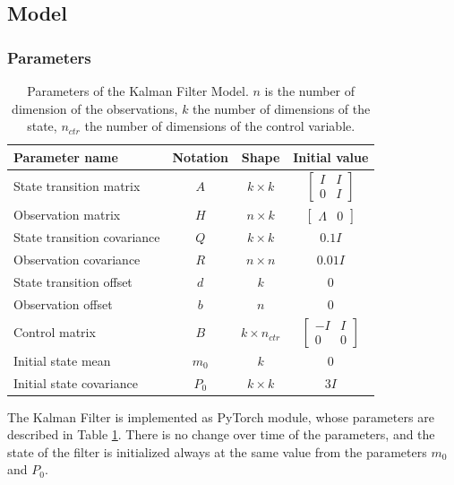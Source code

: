\documentclass{article}
\let\Oldsubsection\subsection
\renewcommand{\subsection}{\FloatBarrier\Oldsubsection}
\begin{document}
\subsection{Model}

\subsubsection{Parameters}

\begin{table}
\caption{Parameters of the Kalman Filter Model. $n$ is the number of dimension of the observations, $k$ the number of dimensions of the state, $n_{ctr}$ the number of dimensions of the control variable.}
\label{table:parameters}
\vspace{5pt}
\begin{tabular}{l c c c}
\toprule
    \bfseries Parameter name & \bfseries Notation & \bfseries Shape & \bfseries Initial value\\
    \hline
    \noalign{\vspace{4pt}}
    State transition matrix & $A$ & $k \times k$ & $\begin{bmatrix}I & I \\ 0 & I\end{bmatrix}$ \\
    \noalign{\vspace{4pt}}
    Observation matrix & $H$ & $n \times k$ & $\begin{bmatrix}\Lambda & 0 \end{bmatrix}$ \\
    State transition covariance & $Q$ & $k \times k$ & $0.1 I$ \\
    Observation covariance & $R$ & $n \times n$ & $0.01 I$\\
    State transition offset & $d$ & $k$ & 0 \\
    Observation offset & $b$ & $n$ & 0 \\
    Control matrix & $B$ & $k \times n_{ctr}$ & $\begin{bmatrix} -I & I \\ 0 & 0 \end{bmatrix}$ \\
    Initial state mean & $m_0$ & $k$ & $0$ \\
    Initial state covariance & $P_0$ & $k \times k$ & $3 I$ \\
\bottomrule
\end{tabular}
\end{table}

The Kalman Filter is implemented as PyTorch module, whose parameters are described in Table \ref{table:parameters}.
There is no change over time of the parameters, and the state of the filter is initialized always at the same value from the parameters $m_0$ and $P_0$.
\end{document}

